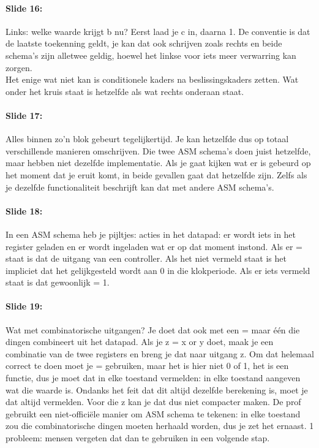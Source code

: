 \documentclass[10pt,a4paper]{book}
\begin{document}
\paragraph{Slide 16:} Links: welke waarde krijgt b nu? Eerst laad je c in, daarna 1. De conventie is dat de laatste toekenning geldt, je kan dat ook schrijven zoals rechts en beide schema's zijn alletwee geldig, hoewel het linkse voor iets meer verwarring kan zorgen.\\
Het enige wat niet kan is conditionele kaders na beslissingskaders zetten. Wat onder het kruis staat is hetzelfde als wat rechts onderaan staat.

\paragraph{Slide 17:} Alles binnen zo'n blok gebeurt tegelijkertijd. Je kan hetzelfde dus op totaal verschillende manieren omschrijven. Die twee ASM schema's doen juist hetzelfde, maar hebben niet dezelfde implementatie. Als je gaat kijken wat er is gebeurd op het moment dat je eruit komt, in beide gevallen gaat dat hetzelfde zijn. Zelfs als je dezelfde functionaliteit beschrijft kan dat met andere ASM schema's.

\paragraph{Slide 18:} In een ASM schema heb je pijltjes: acties in het datapad: er wordt iets in het register geladen en er wordt ingeladen wat er op dat moment instond. Als er = staat is dat de uitgang van een controller. Als het niet vermeld staat is het impliciet dat het gelijkgesteld wordt aan 0 in die klokperiode. Als er iets vermeld staat is dat gewoonlijk = 1.

\paragraph{Slide 19:} Wat met combinatorische uitgangen? Je doet dat ook met een = maar \'e\'en die dingen combineert uit het datapad. Als je z = x or y doet, maak je een combinatie van de twee registers en breng je dat naar uitgang z. Om dat helemaal correct te doen moet je = gebruiken, maar het is hier niet 0 of 1, het is een functie, dus je moet dat in elke toestand vermelden: in elke toestand aangeven wat die waarde is. Ondanks het feit dat dit altijd dezelfde berekening is, moet je dat altijd vermelden. Voor die z kan je dat dus niet compacter maken.
De prof gebruikt een niet-offici\"ele manier om ASM schema te tekenen: in elke toestand zou die combinatorische dingen moeten herhaald worden, dus je zet het ernaast. 1 probleem: mensen vergeten dat dan  te gebruiken in een volgende stap.
\end{document}
